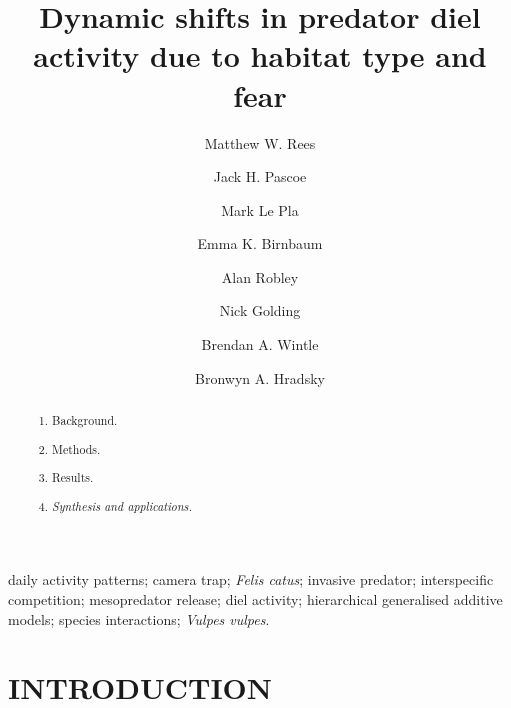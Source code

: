 \documentclass[]{elsarticle} %
\providecommand{\tightlist}{%
  \setlength{\itemsep}{0pt}\setlength{\parskip}{0pt}}
\begin{document}
\begin{frontmatter}

  \title{Dynamic shifts in predator diel activity due to habitat type and fear}
    \author[UOM]{Matthew W. Rees}
    \author[CEC]{Jack H. Pascoe}
  
    \author[CEC]{Mark Le Pla}
  
    \author[CEC]{Emma K. Birnbaum}
  
    \author[ARI]{Alan Robley}
  
    \author[CU,TKI]{Nick Golding}
  
    \author[UOM]{Brendan A. Wintle}
  
    \author[UOM]{Bronwyn A. Hradsky}
  
      \address[UOM]{Quantitative \& Applied Ecology Group, School of Ecosystem and Forest Science, The University of Melbourne, Parkville, VIC, Australia}
    \address[CEC]{Conservation Ecology Centre, Otway Lighthouse Rd, Cape Otway, VIC, Australia}
    \address[ARI]{Department of Environment, Land, Water and Planning, Arthur Rylah Institute for Environmental Research, Heidelberg, Australia}
    \address[CU]{Curtin University, Bentley, WA, Australia}
    \address[TKI]{Telethon Kids Institute, Perth Children's Hospital, Nedlands, WA, Australia}
  
  \begin{abstract}
  \begin{enumerate}
  \def\labelenumi{\arabic{enumi}.}
  \tightlist
  \item
    Background.
  \item
    Methods.
  \item
    Results.
  \item
    \emph{Synthesis and applications.}
  \end{enumerate}
  \end{abstract}
   \begin{keyword} daily activity patterns; camera trap; \emph{Felis catus}; invasive predator; interspecific competition; mesopredator release; diel activity; hierarchical generalised additive models; species interactions; \emph{Vulpes vulpes}.\end{keyword}
 \end{frontmatter}

\parskip=12pt

\newpage

\hypertarget{introduction}{%
\section{INTRODUCTION}\label{introduction}}
\end{document}
